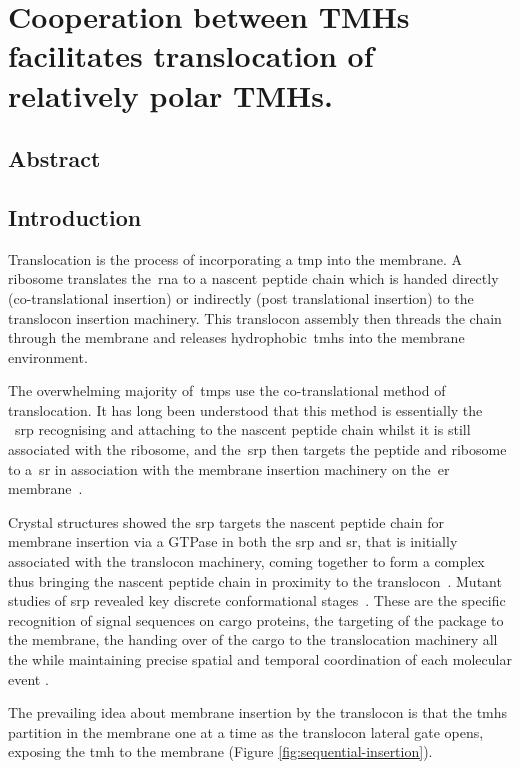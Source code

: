 \chapter{Cooperation between TMHs facilitates translocation of relatively polar TMHs.}
\section{Abstract}
\section{Introduction}

Translocation is the process of incorporating a \gls{tmp} into the membrane.
A ribosome translates the~\gls{rna} to a nascent peptide chain which is handed directly (co-translational insertion) or indirectly (post translational insertion) to the translocon insertion machinery.
This translocon assembly then threads the chain through the membrane and releases hydrophobic~\gls{tmh}s into the membrane environment.

The overwhelming majority of~\gls{tmp}s use the co-translational method of translocation.
It has long been understood that this method is essentially the ~\gls{srp} recognising and attaching to the nascent peptide chain whilst it is still associated with the ribosome, and the~\gls{srp} then targets the peptide and ribosome to a~\gls{sr} in association with the membrane insertion machinery on the~\gls{er} membrane~\cite{Pool2005, Hessa2005}.

Crystal structures showed the \gls{srp} targets the nascent peptide chain for membrane insertion via a GTPase in both the \gls{srp} and \gls{sr}, that is initially associated with the translocon machinery, coming together to form a complex thus bringing the nascent peptide chain in proximity to the translocon~\cite{Shan2005}.
Mutant studies of \gls{srp} revealed key discrete conformational stages~\cite{Shan2005}.
These are the specific recognition of signal sequences on cargo proteins, the targeting of the package to the membrane, the handing over of the cargo to the translocation machinery all the while maintaining precise spatial and temporal coordination of each molecular event \cite{Saraogi2011}.



The prevailing idea about membrane insertion by the translocon is that the \gls{tmh}s partition in the membrane one at a time as the translocon lateral gate opens, exposing the \gls{tmh} to the membrane (Figure \ref{fig:sequential-insertion})\cite{Cymer2015}.

